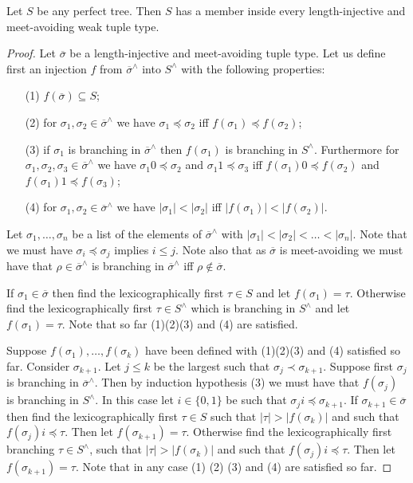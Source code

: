\begin{lemma} \label{lem:doesnotavoid_smntt}
Let $S$ be any perfect tree. Then $S$ has a member inside every length-injective and meet-avoiding weak tuple type.
\end{lemma}
\begin{proof}
Let $\overline{\sigma}$ be a length-injective and meet-avoiding tuple type. Let us define first an injection $f$ from $\overline{\sigma}^{\wedge}$ into $S^{\wedge}$ with the following properties:
\begin{enumerate}
\item[(1)] $f(\overline{\sigma}) \subseteq S$;
\item[(2)] for $\sigma_1,\sigma_2 \in \overline{\sigma}^{\wedge}$ we have $\sigma_1 \preceq \sigma_2$ iff $f(\sigma_1) \preceq f(\sigma_2)$;
\item[(3)] if $\sigma_1$ is branching in $\overline{\sigma}^{\wedge}$ then $f(\sigma_1)$ is branching in $S^\wedge$. Furthermore for $\sigma_1,\sigma_2, \sigma_3 \in \overline{\sigma}^{\wedge}$ we have $\sigma_1 0 \preceq \sigma_2$ and $\sigma_1 1 \preceq \sigma_3$ iff $f(\sigma_1) 0 \preceq f(\sigma_2)$ and $f(\sigma_1) 1 \preceq f(\sigma_3)$;
\item[(4)] for $\sigma_1,\sigma_2 \in \overline{\sigma}^{\wedge}$ we have $|\sigma_1| < |\sigma_2|$ iff $|f(\sigma_1)| < |f(\sigma_2)|$.
\end{enumerate}

Let $\sigma_1, \dots, \sigma_n$ be a list of the elements of $\overline{\sigma}^{\wedge}$ with $|\sigma_1| < |\sigma_2| < \dots < |\sigma_n|$. Note that we must have $\sigma_i \preceq \sigma_j$ implies $i \leq j$. Note also that as $\overline{\sigma}$ is meet-avoiding we must have that $\rho \in \overline{\sigma}^\wedge$ is branching in $\overline{\sigma}^\wedge$ iff $\rho \notin \overline{\sigma}$.


If $\sigma_1 \in \overline{\sigma}$ then find the lexicographically first $\tau \in S$ and let $f(\sigma_1) = \tau$. Otherwise find the lexicographically first $\tau \in S^\wedge$ which is branching in $S^\wedge$ and let $f(\sigma_1) = \tau$. Note that so far (1)(2)(3) and (4) are satisfied.

Suppose $f(\sigma_1), \dots, f(\sigma_k)$ have been defined with (1)(2)(3) and (4) satisfied so far. Consider $\sigma_{k+1}$. Let $j \leq k$ be the largest such that $\sigma_{j} \prec \sigma_{k+1}$. Suppose first $\sigma_j$ is branching in $\overline{\sigma}^{\wedge}$. Then by induction hypothesis (3) we must have that $f(\sigma_j)$ is branching in $S^{\wedge}$. In this case let $i \in \{0,1\}$ be such that $\sigma_{j} i \preceq \sigma_{k+1}$. If $\sigma_{k+1} \in \overline{\sigma}$ then find the lexicographically first $\tau \in S$ such that $|\tau| > |f(\sigma_k)|$ and such that $f(\sigma_j) i \preceq \tau$. Then let $f(\sigma_{k+1}) = \tau$. Otherwise find the lexicographically first branching $\tau \in S^{\wedge}$, such that $|\tau| > |f(\sigma_k)|$ and such that $f(\sigma_j) i \preceq \tau$. Then let $f(\sigma_{k+1}) = \tau$. Note that in any case (1) (2) (3) and (4) are satisfied so far.


\end{proof}
